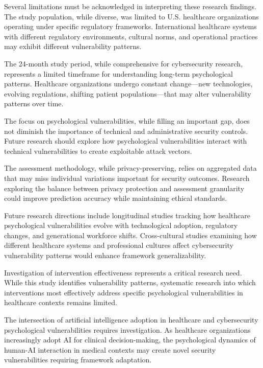 \documentclass[10pt, twocolumn]{article}
\begin{document}
Several limitations must be acknowledged in interpreting these research findings. The study population, while diverse, was limited to U.S. healthcare organizations operating under specific regulatory frameworks. International healthcare systems with different regulatory environments, cultural norms, and operational practices may exhibit different vulnerability patterns.

The 24-month study period, while comprehensive for cybersecurity research, represents a limited timeframe for understanding long-term psychological patterns. Healthcare organizations undergo constant change—new technologies, evolving regulations, shifting patient populations—that may alter vulnerability patterns over time.

The focus on psychological vulnerabilities, while filling an important gap, does not diminish the importance of technical and administrative security controls. Future research should explore how psychological vulnerabilities interact with technical vulnerabilities to create exploitable attack vectors.

The assessment methodology, while privacy-preserving, relies on aggregated data that may miss individual variations important for security outcomes. Research exploring the balance between privacy protection and assessment granularity could improve prediction accuracy while maintaining ethical standards.

Future research directions include longitudinal studies tracking how healthcare psychological vulnerabilities evolve with technological adoption, regulatory changes, and generational workforce shifts. Cross-cultural studies examining how different healthcare systems and professional cultures affect cybersecurity vulnerability patterns would enhance framework generalizability.

Investigation of intervention effectiveness represents a critical research need. While this study identifies vulnerability patterns, systematic research into which interventions most effectively address specific psychological vulnerabilities in healthcare contexts remains limited.

The intersection of artificial intelligence adoption in healthcare and cybersecurity psychological vulnerabilities requires investigation. As healthcare organizations increasingly adopt AI for clinical decision-making, the psychological dynamics of human-AI interaction in medical contexts may create novel security vulnerabilities requiring framework adaptation.
\end{document}
